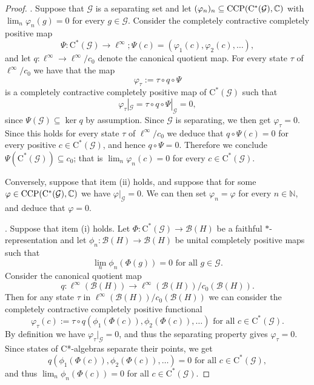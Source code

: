 \documentclass[11pt, draft]{amsart}
\numberwithin{equation}{section}
\theoremstyle{plain}
\theoremstyle{definition}
\theoremstyle{remark}
\newcommand{\B}{{\mathcal{B}}}
\newcommand{\G}{{\mathcal{G}}}
\newcommand\vphi{\varphi}
\newcommand{\bC}{\mathbb{C}}
\newcommand{\bN}{\mathbb{N}}
\newcommand{\foral}{\text{ for all }}
\newcommand{\ca}{\mathrm{C}^*}
\begin{document}
\begin{proof}

\noindent
[(i) $\Leftrightarrow$ (ii)].
Suppose that $\G$ is a separating set and let $(\vphi_n)_n \subseteq {\rm CCP}(\ca(\G), \bC)$ with $\lim_n \vphi_n(g)=0$ for every $g \in \G$.
Consider the completely contractive completely positive map
\[
\Psi \colon \ca(\G) \to \ell^\infty; \Psi(c) = (\vphi_1(c), \vphi_2(c), \dots),
\]
and let $q \colon \ell^\infty \to \ell^\infty/c_0$ denote the canonical quotient map.
For every state $\tau$ of $\ell^\infty/c_0$ we have that the map
\[
\vphi_\tau := \tau \circ q \circ \Psi
\]
is a completely contractive completely positive map of $\ca(\G)$ such that
\[
\vphi_\tau|_{\G} = \tau \circ q \circ \Psi|_{\G} = 0,
\]
since $\Psi(\G) \subseteq \ker q$ by assumption.
Since $\G$ is separating, we then get $\vphi_\tau = 0$.
Since this holds for every state $\tau$ of $\ell^\infty/c_0$ we deduce that $q \circ \Psi(c) = 0$ for every positive $c \in \ca(\G)$, and hence $q\circ \Psi=0$.
Therefore we conclude $\Psi(\ca(\G)) \subseteq c_0$; that is $\lim_n \vphi_n(c) = 0$ for every $c \in \ca(\G)$.

Conversely, suppose that item (ii) holds, and suppose that for some $\vphi \in {\rm CCP}(\ca(\G), \bC)$ we have $\vphi|_{\G} = 0$.
We can then set $\vphi_n = \vphi$ for every $n \in \bN$, and deduce that $\vphi = 0$.

\smallskip

.
Suppose that item (i) holds.
Let $\Phi \colon \ca(\G) \to \B(H)$ be a faithful $*$-representation and let $\phi_n \colon \B(H) \to \B(H)$ be unital completely positive maps such that 
\[
\lim_n \phi_n(\Phi(g)) = 0 \foral g \in \G.
\]
Consider the canonical quotient map
\[
q \colon \ell^{\infty}(\B(H)) \to \ell^\infty(\B(H))/c_0(\B(H)).
\]
Then for any state $\tau$ in $\ell^\infty(\B(H))/c_0(\B(H))$ we can consider the completely contractive completely positive functional
\[
\vphi_{\tau}(c) := \tau \circ q(\phi_1(\Phi(c)), \phi_2(\Phi(c)), \dots)
\foral
c \in \ca(\G).
\]
By definition we have $\vphi_{\tau}|_{\G} = 0$, and thus the separating property gives $\vphi_{\tau}=0$.
Since states of C*-algebras separate their points, we get
\[
q(\phi_1(\Phi(c)), \phi_2(\Phi(c)), \dots) = 0
\foral
c \in \ca(\G),
\]
and thus $\lim_n \phi_n(\Phi(c)) = 0$ for all $c \in \ca(\G)$.


\end{proof}
\end{document}
